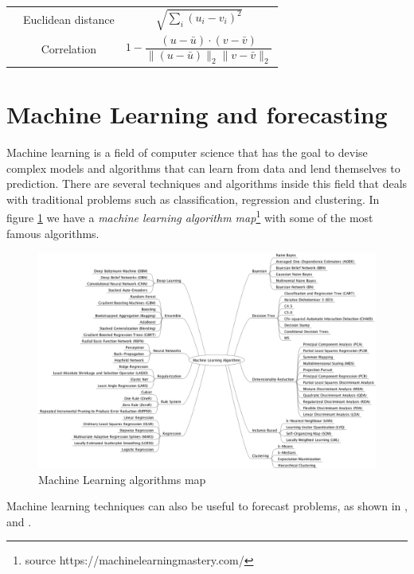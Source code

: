 \documentclass[12pt]{report}
\begin{document}
\begin{table}
\begin{center}
\begin{tabular}{ccc}
 & Euclidean distance & $\sqrt{\sum_i (u_i - v_i)^2}$\\
 & Correlation & $1 - \dfrac{(u - \bar{u}) \cdot (v-\bar{v})}{\|(u - \bar{u}) \|_{2} \|v-\bar{v} \|_{2}}  $\\ 

\end{tabular}
\end{center}
\end{table}

\section{Machine Learning and forecasting}

Machine learning is a field of computer science that has the goal to devise complex models and algorithms that can learn from data and lend themselves to prediction. There are several techniques and algorithms inside this field that deals with traditional problems such as classification, regression and clustering. In figure \ref{fig:ml} we have a \textit{machine learning algorithm map}\footnote{source https://machinelearningmastery.com/} with some of the most famous algorithms.

\begin{figure}[!ht]
\centering
\includegraphics[width=\textwidth]{MachineLearningAlgorithms.png}
\caption{Machine Learning algorithms map}
\label{fig:ml}
\end{figure}

Machine learning techniques can also be useful to forecast problems, as shown in \citet{shen2012stock}, \citet{santillana2015combining} and \citet{bai2005prediction}. 
\end{document}
